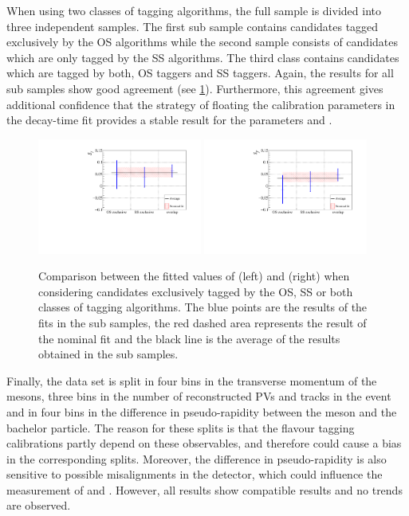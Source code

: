 When using two classes of tagging algorithms, the full sample is divided into three independent samples.
The first sub sample contains candidates tagged exclusively by the OS algorithms while the second sample consists of candidates which are only tagged by the SS algorithms.
The third class contains candidates which are tagged by both, OS taggers and SS taggers.
Again, the results for all sub samples show good agreement (see \cref{fig:splitByTagger}).
Furthermore, this agreement gives additional confidence that the strategy of floating the calibration parameters in the decay-time fit provides a stable result for the \CP parameters \Sf and \Sfbar.
\begin{figure}[tbp]
    \centering
    \includegraphics[width=0.48\textwidth]{10TimeFit/figs/Sf_splits_SSOSExclusive.pdf}
    \includegraphics[width=0.48\textwidth]{10TimeFit/figs/Sfbar_splits_SSOSExclusive.pdf}
    \caption{Comparison between the fitted values of \Sf (left) and \Sfbar (right) when considering candidates exclusively tagged by the OS, SS or both classes of tagging algorithms.
    The blue points are the results of the fits in the sub samples, the red dashed area represents the result of the nominal fit and the black line is the average of the results obtained in the sub samples.}
    \label{fig:splitByTagger}
\end{figure}

Finally, the data set is split in four bins in the transverse momentum of the \Bz mesons, three bins in the number of reconstructed \ac{PV}s and tracks in the event and in four bins in the difference in pseudo-rapidity between the \Dpm meson and the bachelor particle.
The reason for these splits is that the flavour tagging calibrations partly depend on these observables, and therefore could cause a bias in the corresponding splits.
Moreover, the difference in pseudo-rapidity is also sensitive to possible misalignments in the detector, which could influence the measurement of \Sf and \Sfbar.
However, all results show compatible results and no trends are observed.

